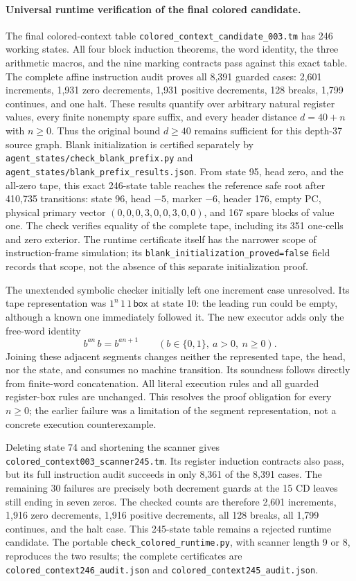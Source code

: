 \paragraph{Universal runtime verification of the final colored candidate.}
The final colored-context table
\texttt{colored\_context\_candidate\_003.tm} has 246 working states.
All four block induction theorems, the word identity, the three arithmetic
macros, and the nine marking contracts pass against this exact table.
The complete affine instruction audit proves all 8,391 guarded cases:
2,601 increments, 1,931 zero decrements, 1,931 positive decrements,
128 breaks, 1,799 continues, and one halt.  These results quantify over
arbitrary natural register values, every finite nonempty spare suffix,
and every header distance $d=40+n$ with $n\geq0$.  Thus the original
bound $d\geq40$ remains sufficient for this depth-37 source graph.
Blank initialization is certified separately by
\texttt{agent\_states/check\_blank\_prefix.py} and
\texttt{agent\_states/blank\_prefix\_results.json}.  From state 95,
head zero, and the all-zero tape, this exact 246-state table reaches
the reference safe root after 410,735 transitions: state 96, head
$-5$, marker $-6$, header 176, empty PC, physical primary vector
$(0,0,0,3,0,0,3,0,0)$, and 167 spare blocks of value one.
The check verifies equality of the complete tape, including its
351 one-cells and zero exterior.  The runtime certificate itself has
the narrower scope of instruction-frame simulation; its
\texttt{blank\_initialization\_proved=false} field records that scope,
not the absence of this separate initialization proof.

The unextended symbolic checker initially left one increment case
unresolved.  Its tape representation was $1^n\,1\,1\,\mathsf{box}$
at state 10: the leading run could be empty, although a known one
immediately followed it.  The new executor adds only the free-word
identity
\[
 b^{an}\,b=b^{an+1}\qquad(b\in\{0,1\},\ a>0,\ n\geq0).
\]
Joining these adjacent segments changes neither the represented tape,
the head, nor the state, and consumes no machine transition.  Its
soundness follows directly from finite-word concatenation.  All
literal execution rules and all guarded register-box rules are
unchanged.  This resolves the proof obligation for every $n\geq0$;
the earlier failure was a limitation of the segment representation,
not a concrete execution counterexample.

Deleting state 74 and shortening the scanner gives
\texttt{colored\_context003\_scanner245.tm}.  Its register induction
contracts also pass, but its full instruction audit succeeds in only
8,361 of the 8,391 cases.  The remaining 30 failures are precisely both
decrement guards at the 15 CD leaves still ending in seven zeros.
The checked counts are therefore 2,601 increments, 1,916 zero
decrements, 1,916 positive decrements, all 128 breaks, all 1,799
continues, and the halt case.  This 245-state table remains a rejected
runtime candidate.  The portable
\texttt{check\_colored\_runtime.py}, with scanner length 9 or 8,
reproduces the two results; the complete certificates are
\texttt{colored\_context246\_audit.json} and
\texttt{colored\_context245\_audit.json}.
